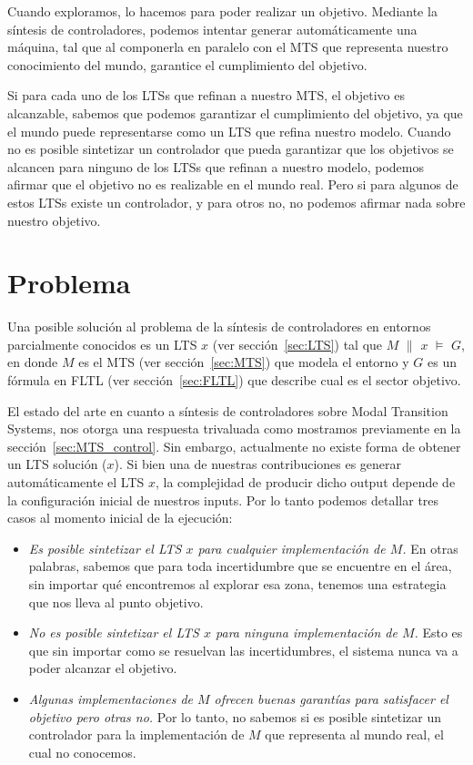 Cuando exploramos, lo hacemos para poder realizar un objetivo. Mediante la 
síntesis de controladores, podemos intentar 
generar automáticamente una máquina, tal que al componerla en paralelo con el 
MTS que representa nuestro conocimiento 
del mundo, garantice el cumplimiento del objetivo.

Si para cada uno de los LTSs que refinan a nuestro MTS, el objetivo es 
alcanzable, sabemos que podemos garantizar el
cumplimiento del objetivo, ya que el mundo puede representarse como un LTS que 
refina nuestro modelo. Cuando no es posible
sintetizar un controlador que pueda garantizar que los objetivos se alcancen 
para ninguno de los LTSs que refinan a nuestro
modelo, podemos afirmar que el objetivo no es realizable en el mundo real. Pero 
si para algunos de estos LTSs existe un
controlador, y para otros no, no podemos afirmar nada sobre nuestro objetivo.

\section{Problema}

Una posible solución al problema de la síntesis de controladores en entornos 
parcialmente conocidos es un LTS $x$ (ver sección~\ref{sec:LTS}) tal que 
$M$ $\parallel$ $x$ $\models$ $G$, en donde $M$ es el MTS (ver 
sección~\ref{sec:MTS}) que modela el entorno y $G$ es un fórmula en FLTL (ver 
sección~\ref{sec:FLTL}) que describe cual es el sector objetivo. 

El estado del arte en cuanto a síntesis de controladores sobre Modal Transition 
Systems, nos otorga una respuesta trivaluada como mostramos previamente en la 
sección~\ref{sec:MTS_control}. Sin embargo, actualmente no existe forma de 
obtener un LTS solución ($x$). Si bien una de nuestras contribuciones es 
generar automáticamente el LTS $x$, la complejidad de producir dicho output 
depende de la configuración inicial de nuestros inputs. 
Por lo tanto podemos detallar tres casos al momento inicial de la ejecución:

\begin{itemize}

\item
\textit{Es posible sintetizar el LTS $x$ para cualquier implementación de $M$.} 
En otras 
palabras, sabemos que para toda incertidumbre que se encuentre en el área, sin 
importar qué encontremos al explorar esa zona, tenemos una estrategia que nos 
lleva al punto objetivo.

\item
\textit{No es posible sintetizar el LTS $x$ para ninguna implementación de 
$M$.} Esto es que sin importar como se resuelvan las incertidumbres, el sistema 
nunca va a poder alcanzar el objetivo.

\item
\textit{Algunas implementaciones de $M$ ofrecen buenas garantías para 
satisfacer el 
objetivo pero otras no. }
Por lo tanto, no sabemos si es posible sintetizar un controlador para la implementación de $M$ que representa al mundo real, el cual no conocemos.

\end{itemize}

